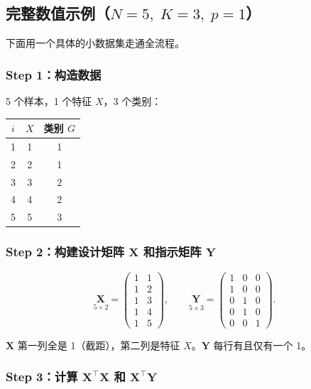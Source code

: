 \subsection{完整数值示例（$N=5,\;K=3,\;p=1$）}

下面用一个具体的小数据集走通全流程。

\subsubsection{Step 1：构造数据}

5 个样本，1 个特征 $X$，3 个类别：

\begin{center}
\begin{tabular}{c|c|c}
\hline
$i$ & $X$ & 类别 $G$ \\
\hline
1 & 1 & 1 \\
2 & 2 & 1 \\
3 & 3 & 2 \\
4 & 4 & 2 \\
5 & 5 & 3 \\
\hline
\end{tabular}
\end{center}

\subsubsection{Step 2：构建设计矩阵 $\mathbf{X}$ 和指示矩阵 $\mathbf{Y}$}

\[
\underset{5\times 2}{\mathbf{X}} = 
\begin{pmatrix}
1 & 1 \\
1 & 2 \\
1 & 3 \\
1 & 4 \\
1 & 5
\end{pmatrix},
\qquad
\underset{5\times 3}{\mathbf{Y}} = 
\begin{pmatrix}
1 & 0 & 0 \\
1 & 0 & 0 \\
0 & 1 & 0 \\
0 & 1 & 0 \\
0 & 0 & 1
\end{pmatrix}.
\]

$\mathbf{X}$ 第一列全是 1（截距），第二列是特征 $X$。$\mathbf{Y}$ 每行有且仅有一个 1。

\subsubsection{Step 3：计算 $\mathbf{X}^\top\mathbf{X}$ 和 $\mathbf{X}^\top\mathbf{Y}$}

